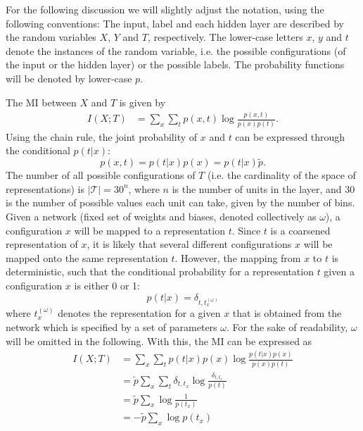 \documentclass[12pt]{report}
\begin{document}
For the following discussion we will slightly adjust the notation, using the following conventions: The input, label and each hidden layer are described by the random variables $X$, $Y$ and $T$, respectively. The lower-case letters $x$, $y$ and $t$ denote the instances of the random variable, i.e. the possible configurations (of the input or the hidden layer) or the possible labels. The probability functions will be denoted by lower-case $p$.

The MI between $X$ and $T$ is given by
\begin{align}
I(X;T) &= \sum \limits_{x} \sum \limits_{t} p(x,t) \log\frac{p(x,t)}{p(x)p(t)}.
\end{align}
Using the chain rule, the joint probability of $x$ and $t$ can be expressed through the conditional $p(t|x)$:
\begin{equation}
p(x,t) = p(t|x)p(x) = p(t|x) \tilde{p}.
\end{equation}
The number of all possible configurations of $T$ (i.e. the cardinality of the space of representations) is $|\mathcal{T}| = 30^n$, where $n$ is the number of units in the layer, and 30 is the number of possible values each unit can take, given by the number of bins. Given a network (fixed set of weights and biases, denoted collectively as $\omega$), a configuration $x$ will be mapped to a representation $t$. Since $t$ is a coarsened representation of $x$, it is likely that several different configurations $x$ will be mapped onto the same representation $t$. However, the mapping from $x$ to $t$ is deterministic, such that the conditional probability for a representation $t$ given a configuration $x$ is either 0 or 1:
\begin{equation}
p(t|x) = \delta_{t,t^{(\omega)}_x}
\end{equation}
where $t^{(\omega)}_x$ denotes the representation for a given $x$ that is obtained from the network which is specified by a set of parameters $\omega$. For the sake of readability, $\omega$ will be omitted in the following. With this, the MI can be expressed as
\begin{align}
I(X;T) &= \sum \limits_{x} \sum \limits_{t} p(t|x) p(x) \log\frac{p(t|x)p(x)}{p(x)p(t)}\\
   &= \tilde{p} \sum \limits_{x} \sum \limits_{t} \delta_{t,t_x} \log\frac{\delta_{t,t_x}}{p(t)}\\
   &= \tilde{p} \sum \limits_{x} \log\frac{1}{p(t_x)}\\
   &= - \tilde{p} \sum \limits_{x} \log p(t_x)   
\end{align}
\end{document}
